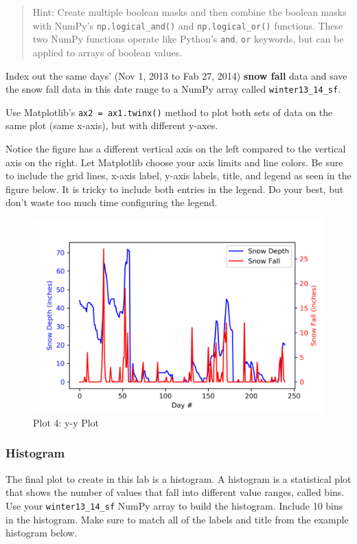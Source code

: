 \documentclass[11pt]{article}
\makeatletter
\def\maxwidth{\ifdim\Gin@nat@width>\linewidth\linewidth
    \else\Gin@nat@width\fi}
\let\Oldincludegraphics\includegraphics
\renewcommand{\includegraphics}[1]{\Oldincludegraphics[width=.8\maxwidth]{#1}}
\makeatother
\begin{document}
\begin{quote}
Hint: Create multiple boolean masks and then combine the boolean masks
with NumPy's \texttt{np.logical\_and()} and \texttt{np.logical\_or()}
functions. These two NumPy functions operate like Python's \texttt{and},
\texttt{or} keywords, but can be applied to arrays of boolean values.
\end{quote}

Index out the same days' (Nov 1, 2013 to Fab 27, 2014) \textbf{snow
fall} data and save the snow fall data in this date range to a NumPy
array called \texttt{winter13\_14\_sf}.

Use Matplotlib's \texttt{ax2\ =\ ax1.twinx()} method to plot both sets
of data on the same plot (same x-axis), but with different y-axes.

Notice the figure has a different vertical axis on the left compared to
the vertical axis on the right. Let Matplotlib choose your axis limits
and line colors. Be sure to include the grid lines, x-axis label, y-axis
labels, title, and legend as seen in the figure below. It is tricky to
include both entries in the legend. Do your best, but don't waste too
much time configuring the legend.

\begin{figure}[h!]
\centering
\includegraphics{images/yyplot.png}
\caption{Plot 4: y-y Plot}
\end{figure}
\newpage
    \hypertarget{histogram}{%
\subsubsection{Histogram}\label{histogram}}

The final plot to create in this lab is a histogram. A histogram is a
statistical plot that shows the number of values that fall into
different value ranges, called bins. Use your \texttt{winter13\_14\_sf}
NumPy array to build the histogram. Include 10 bins in the histogram.
Make sure to match all of the labels and title from the example
histogram below.
\end{document}
